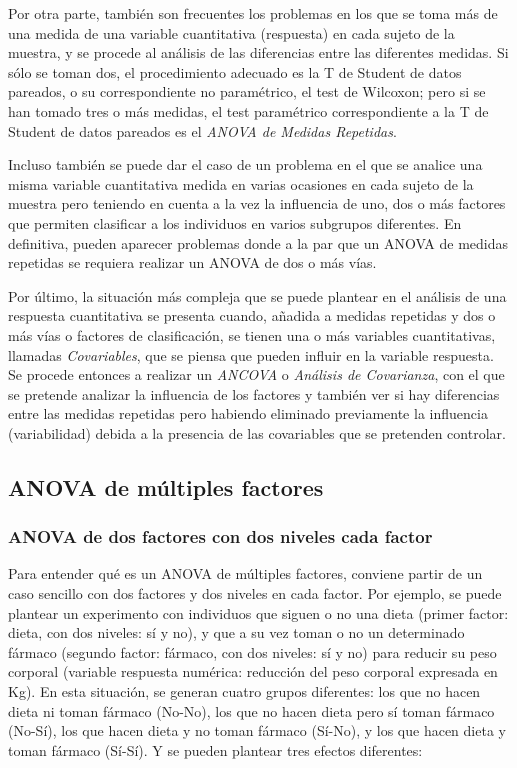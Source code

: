 Por otra parte, también son frecuentes los problemas en los que se toma más de una medida de una variable cuantitativa
(respuesta) en cada sujeto de la muestra, y se procede al análisis de las diferencias entre las diferentes medidas.
Si sólo se toman dos, el procedimiento adecuado es la T de Student de datos pareados, o su correspondiente no
paramétrico, el test de Wilcoxon; pero si se han tomado tres o más medidas, el test paramétrico correspondiente a la T
de Student de datos pareados es el \emph{ANOVA de Medidas Repetidas}.

Incluso también se puede dar el caso de un problema en el que se analice una misma variable cuantitativa medida en
varias ocasiones en cada sujeto de la muestra pero teniendo en cuenta a la vez la influencia de uno, dos o más factores
que permiten clasificar a los individuos en varios subgrupos diferentes.
En definitiva, pueden aparecer problemas donde a la par que un ANOVA de medidas repetidas se requiera realizar un ANOVA
de dos o más vías.

Por último, la situación más compleja que se puede plantear en el análisis de una respuesta cuantitativa se presenta
cuando, añadida a medidas repetidas y dos o más vías o factores de clasificación, se tienen una o más variables
cuantitativas, llamadas \emph{Covariables}, que se piensa que pueden influir en la variable respuesta.
Se procede entonces a realizar un \emph{ANCOVA} o \emph{Análisis de Covarianza}, con el que se pretende analizar la
influencia de los factores y también ver si hay diferencias entre las medidas repetidas pero habiendo eliminado
previamente la influencia (variabilidad) debida a la presencia de las covariables que se pretenden controlar.


\subsection{ANOVA de múltiples factores}
\subsubsection{ANOVA de dos factores con dos niveles cada factor}
Para entender qué es un ANOVA de múltiples factores, conviene partir de un caso sencillo con dos factores y dos niveles
en cada factor. Por ejemplo, se puede plantear un experimento con individuos que siguen o no una dieta (primer factor:
dieta, con dos niveles: sí y no), y que a su vez toman o no un determinado fármaco (segundo factor: fármaco, con dos
niveles: sí y no) para reducir su peso corporal (variable respuesta numérica: reducción del peso corporal expresada en
Kg). En esta situación, se generan cuatro grupos diferentes: los que no hacen dieta ni toman fármaco (No-No), los que no
hacen dieta pero sí toman fármaco (No-Sí), los que hacen dieta y no toman fármaco (Sí-No), y los que hacen dieta y toman
fármaco (Sí-Sí). Y se pueden plantear tres efectos diferentes:

